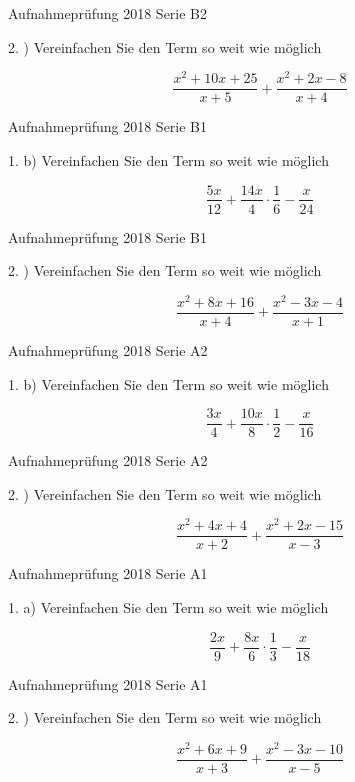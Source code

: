 Aufnahmeprüfung 2018 Serie B2

2. ) Vereinfachen Sie den Term so weit wie möglich

$$\frac{x^2+10x+25}{x+5} + \frac{x^2+2x-8}{x+4}$$

Aufnahmeprüfung 2018 Serie B1

1. b) Vereinfachen Sie den Term so weit wie möglich

$$\frac{5x}{12} + \frac{14x}{4} \cdot{} \frac16 - \frac{x}{24}$$

Aufnahmeprüfung 2018 Serie B1

2. ) Vereinfachen Sie den Term so weit wie möglich

$$\frac{x^2+8x+16}{x+4} + \frac{x^2-3x-4}{x+1}$$

Aufnahmeprüfung 2018 Serie A2

1. b) Vereinfachen Sie den Term so weit wie möglich

$$\frac{3x}4 + \frac{10x}8 \cdot{} \frac12 - \frac{x}{16}$$

Aufnahmeprüfung 2018 Serie A2

2. ) Vereinfachen Sie den Term so weit wie möglich

$$\frac{x^2+4x+4}{x+2} + \frac{x^2+2x-15}{x-3}$$

Aufnahmeprüfung 2018 Serie A1

1. a) Vereinfachen Sie den Term so weit wie möglich

$$\frac{2x}9 + \frac{8x}6 \cdot{} \frac13 - \frac{x}{18}$$

Aufnahmeprüfung 2018 Serie A1

2. ) Vereinfachen Sie den Term so weit wie möglich

$$\frac{x^2+6x+9}{x+3} + \frac{x^2-3x-10}{x-5}$$

